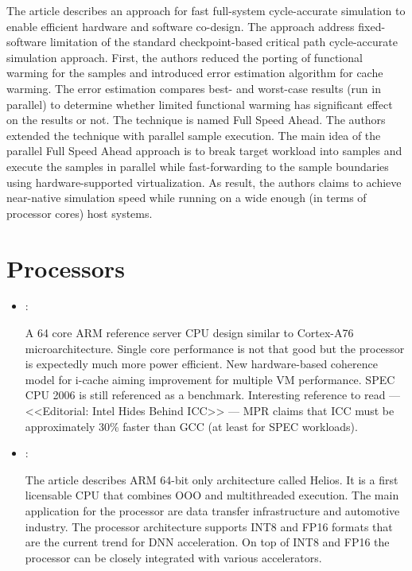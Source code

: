 \begin{itemize}
    The article describes an approach for fast full-system cycle-accurate simulation to enable efficient hardware and software co-design. The approach address fixed-software limitation of the standard checkpoint-based critical path cycle-accurate simulation approach. First, the authors reduced the porting of functional warming for the samples and introduced error estimation algorithm for cache warming. The error estimation compares best- and worst-case results (run in parallel) to determine whether limited functional warming has significant effect on the results or not. The technique is named Full Speed Ahead. The authors extended the technique with parallel sample execution. The main idea of the parallel Full Speed Ahead approach is to break target workload into samples and execute the samples in parallel while fast-forwarding to the sample boundaries using hardware-supported virtualization. As result, the authors claims to achieve near-native simulation speed while running on a wide enough (in terms of processor cores) host systems.
\end{itemize}

\section*{Processors}
\begin{itemize}
    \item \cite{Gwennap:ARM-Neoverse:2019}:

    A 64 core ARM reference server CPU design similar to Cortex-A76 microarchitecture. Single core performance is not that good but the processor is expectedly much more power efficient. New hardware-based coherence model for i-cache aiming improvement for multiple VM performance. SPEC CPU 2006 is still referenced as a benchmark. Interesting reference to read --- <<Editorial: Intel Hides Behind ICC>> --- MPR claims that ICC must be approximately 30\% faster than GCC (at least for SPEC workloads).

    \item \cite{Demler:Helios:2019}:

    The article describes ARM 64-bit only architecture called Helios. It is a first licensable CPU that combines OOO and multithreaded execution. The main application for the processor are data transfer infrastructure and automotive industry. The processor architecture supports INT8 and FP16 formats that are the current trend for DNN acceleration. On top of INT8 and FP16 the processor can be closely integrated with various accelerators.
\end{itemize}

